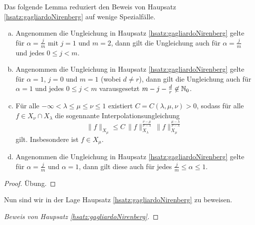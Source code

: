 Das folgende Lemma reduziert den Beweis von Haupsatz \ref{hsatz:gagliardoNirenberg} auf wenige Spezialfälle.

\begin{lem}
  \begin{enumerate}[a)]
    \item Angenommen die Ungleichung in Haupsatz \ref{hsatz:gagliardoNirenberg} gelte für $\alpha = \frac{j}{m}$ mit $j = 1$ und $m = 2$, dann gilt die Ungleichung auch für $\alpha = \frac{j}{m}$ und jedes $0 \leq j < m$.

    \item Angenommen die Ungleichung in Haupsatz \ref{hsatz:gagliardoNirenberg} gelte für $\alpha = 1$, $j = 0$ und $m = 1$ (wobei $d \neq r$), dann gilt die Ungleichung auch für $\alpha = 1$ und jedes $0 \leq j < m$ varausgesetzt $m - j - \frac{d}{r} \not\in \mathbb{N}_0$.
      
    \item Für alle $-\infty < \lambda \leq \mu \leq \nu \leq 1$ existiert $C = C(\lambda, \mu, \nu) > 0$, sodass für alle $f \in X_\nu \cap X_\lambda$ die sogennante Interpolationsungleichung
      $$
      \| f\|_{X_\mu} \leq C \, \|f\|_{X_\lambda}^{\frac{\nu - \mu}{\nu - \lambda}} \, \|f\|_{X_\mu}^{\frac{\mu - \lambda}{\nu - \lambda}}
      $$
      gilt.
      Insbesondere ist $f \in X_\mu$.

    \item Angenommen die Ungleichung in Haupsatz \ref{hsatz:gagliardoNirenberg} gelte für $\alpha = \frac{j}{m}$ und $\alpha = 1$, dann gilt diese auch für jedes $\frac{j}{m} \leq \alpha \leq 1$.
  \end{enumerate}
\end{lem}

\begin{proof}
  Übung.
\end{proof}

Nun sind wir in der Lage Haupsatz \ref{hsatz:gagliardoNirenberg} zu beweisen.

\begin{proof}[Beweis von Haupsatz \ref{hsatz:gagliardoNirenberg}]
\end{proof}

